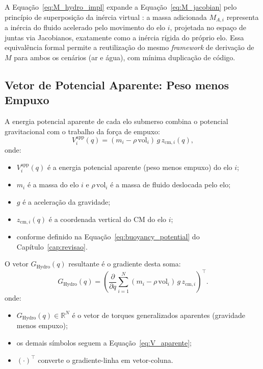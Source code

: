 A Equação~\eqref{eq:M_hydro_impl} expande a Equação~\eqref{eq:M_jacobian} pelo princípio de superposição da inércia virtual \cite{fossen2011handbook}: a massa adicionada $M_{A,i}$ representa a inércia do fluido acelerado pelo movimento do elo $i$, projetada no espaço de juntas via Jacobianos, exatamente como a inércia rígida do próprio elo. Essa equivalência formal permite a reutilização do mesmo \textit{framework} de derivação de $M$ para ambos os cenários (ar e água), com mínima duplicação de código.

\subsection{Vetor de Potencial Aparente: Peso menos Empuxo}

A energia potencial aparente de cada elo submerso combina o potencial gravitacional com o trabalho da força de empuxo:
\begin{equation}
    V_i^{\text{app}}(q) = (m_i - \rho\, \text{vol}_i)\, g\, z_{\text{cm},i}(q),
    \label{eq:V_aparente}
\end{equation}
onde:
\begin{itemize}
    \item $V_i^{\text{app}}(q)$ é a energia potencial aparente (peso menos empuxo) do elo $i$;
    \item $m_i$ é a massa do elo $i$ e $\rho\, \text{vol}_i$ é a massa de fluido deslocada pelo elo;
    \item $g$ é a aceleração da gravidade;
    \item $z_{\text{cm},i}(q)$ é a coordenada vertical do CM do elo $i$;
    \item conforme definido na Equação~\eqref{eq:buoyancy_potential} do Capítulo~\ref{cap:revisao}.
\end{itemize}

O vetor $G_{\text{Hydro}}(q)$ resultante é o gradiente desta soma:
\begin{equation}
    G_{\text{Hydro}}(q) = \left(\frac{\partial}{\partial q} \sum_{i=1}^{N} (m_i - \rho\, \text{vol}_i)\,g\,z_{\text{cm},i}\right)^\top.
    \label{eq:G_hydro}
\end{equation}
onde:
\begin{itemize}
    \item $G_{\text{Hydro}}(q) \in \mathbb{R}^{N}$ é o vetor de torques generalizados aparentes (gravidade menos empuxo);
    \item os demais símbolos seguem a Equação~\eqref{eq:V_aparente};
    \item $(\cdot)^\top$ converte o gradiente-linha em vetor-coluna.
\end{itemize}


